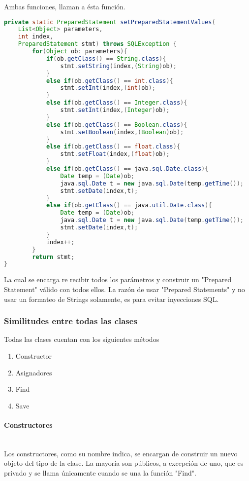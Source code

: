 \documentclass{article}
\begin{document}
        Ambas funciones, llaman a ésta función.
        \begin{lstlisting}[language=Java]
private static PreparedStatement setPreparedStatementValues(
    List<Object> parameters,
    int index,
    PreparedStatement stmt) throws SQLException {
        for(Object ob: parameters){
            if(ob.getClass() == String.class){
                stmt.setString(index,(String)ob);
            }
            else if(ob.getClass() == int.class){
                stmt.setInt(index,(int)ob);
            }
            else if(ob.getClass() == Integer.class){
                stmt.setInt(index,(Integer)ob);
            }
            else if(ob.getClass() == Boolean.class){
                stmt.setBoolean(index,(Boolean)ob);
            }
            else if(ob.getClass() == float.class){
                stmt.setFloat(index,(float)ob);
            }
            else if(ob.getClass() == java.sql.Date.class){
                Date temp = (Date)ob;
                java.sql.Date t = new java.sql.Date(temp.getTime());
                stmt.setDate(index,t);
            }
            else if(ob.getClass() == java.util.Date.class){
                Date temp = (Date)ob;
                java.sql.Date t = new java.sql.Date(temp.getTime());
                stmt.setDate(index,t);
            }
            index++;
        }
        return stmt;
}
        \end{lstlisting}
        La cual se encarga re recibir todos los parámetros y construir un "Prepared Statement" válido con todos ellos. La razón de usar "Prepared Statements" y no usar un formateo de Strings solamente, es para evitar inyecciones SQL.
    \subsubsection{Similitudes entre todas las clases}
        Todas las clases cuentan con los siguientes métodos
        \begin{enumerate}
            \item Constructor
            \item Asignadores
            \item Find
            \item Save
        \end{enumerate}
        \paragraph{Constructores}\mbox{}\\
        Los constructores, como su nombre indica, se encargan de construir un nuevo objeto del tipo de la clase. La mayoría son públicos, a excepción de uno, que es privado y se llama únicamente cuando se una la función "Find".
\end{document}
